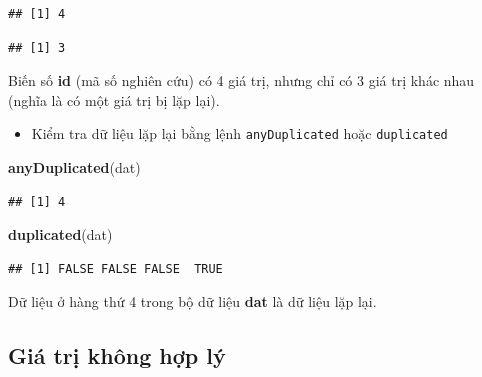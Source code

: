 \documentclass[]{tufte-book}
\newenvironment{Shaded}{}{}
\newcommand{\KeywordTok}[1]{\textcolor[rgb]{0.00,0.44,0.13}{\textbf{#1}}}
\newcommand{\NormalTok}[1]{#1}
\newcommand{\OperatorTok}[1]{\textcolor[rgb]{0.40,0.40,0.40}{#1}}
\providecommand{\tightlist}{%
  \setlength{\itemsep}{0pt}\setlength{\parskip}{0pt}}
\begin{document}
\begin{Shaded}
\end{Shaded}

\begin{verbatim}
## [1] 4
\end{verbatim}

\begin{Shaded}
\end{Shaded}

\begin{verbatim}
## [1] 3
\end{verbatim}

Biến số \textbf{id} (mã số nghiên cứu) có 4 giá trị, nhưng chỉ có 3 giá trị khác nhau (nghĩa là có một giá trị bị lặp lại).

\begin{itemize}
\tightlist
\item
  Kiểm tra dữ liệu lặp lại bằng lệnh \texttt{anyDuplicated} hoặc \texttt{duplicated}
\end{itemize}

\begin{Shaded}
\begin{Highlighting}[]
\KeywordTok{anyDuplicated}\NormalTok{(dat)}
\end{Highlighting}
\end{Shaded}

\begin{verbatim}
## [1] 4
\end{verbatim}

\begin{Shaded}
\begin{Highlighting}[]
\KeywordTok{duplicated}\NormalTok{(dat)}
\end{Highlighting}
\end{Shaded}

\begin{verbatim}
## [1] FALSE FALSE FALSE  TRUE
\end{verbatim}

Dữ liệu ở hàng thứ 4 trong bộ dữ liệu \textbf{dat} là dữ liệu lặp lại.

\hypertarget{gia-tri-khong-hp-ly}{%
\subsection{Giá trị không hợp lý}\label{gia-tri-khong-hp-ly}}
\end{document}
